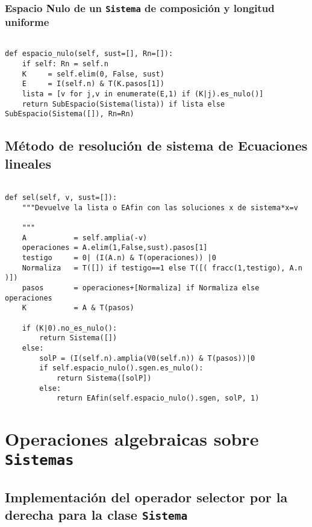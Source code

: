 \documentclass[11pt]{report}
\begin{document}
\subsubsection{Espacio Nulo de un \texttt{Sistema} de composición y longitud uniforme}
\label{sec:org7b3b015}

\begin{verbatim}

def espacio_nulo(self, sust=[], Rn=[]):
    if self: Rn = self.n
    K     = self.elim(0, False, sust)
    E     = I(self.n) & T(K.pasos[1])
    lista = [v for j,v in enumerate(E,1) if (K|j).es_nulo()]
    return SubEspacio(Sistema(lista)) if lista else SubEspacio(Sistema([]), Rn=Rn)

\end{verbatim}

\subsection{Método de resolución de sistema de Ecuaciones lineales}
\label{sec:org254bada}
\begin{verbatim}

def sel(self, v, sust=[]):
    """Devuelve la lista o EAfin con las soluciones x de sistema*x=v

    """
    A           = self.amplia(-v)
    operaciones = A.elim(1,False,sust).pasos[1]
    testigo     = 0| (I(A.n) & T(operaciones)) |0
    Normaliza   = T([]) if testigo==1 else T([( fracc(1,testigo), A.n )])
    pasos       = operaciones+[Normaliza] if Normaliza else operaciones
    K           = A & T(pasos)
    
    if (K|0).no_es_nulo():
        return Sistema([])
    else:
        solP = (I(self.n).amplia(V0(self.n)) & T(pasos))|0
        if self.espacio_nulo().sgen.es_nulo():
            return Sistema([solP])
        else:
            return EAfin(self.espacio_nulo().sgen, solP, 1)

\end{verbatim}

\section{Operaciones algebraicas sobre \texttt{Sistemas}}
\label{sec:org347cbd0}

\subsection{Implementación del operador selector por la derecha para la clase \texttt{Sistema}}
\label{sec:orgb2fdbe3}
\end{document}
